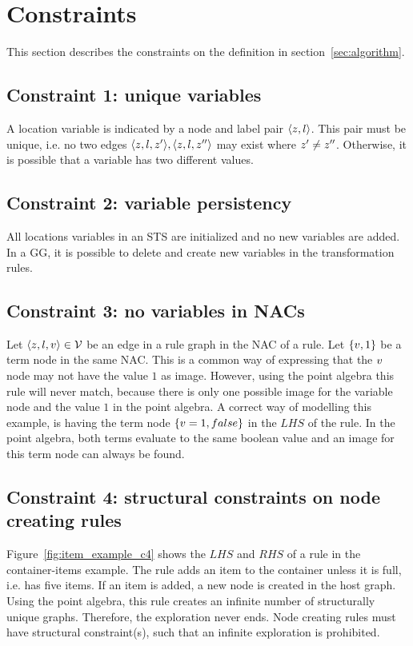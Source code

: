 \section{Constraints}\label{sec:constraints}

This section describes the constraints on the definition in section~\ref{sec:algorithm}.

\subsection{Constraint 1: unique variables}\label{sec:constraint-1}
A location variable is indicated by a node and label pair $\langle z, l\rangle$. This pair must be unique, i.e. no two edges $\langle z, l, z'\rangle, \langle z, l, z''\rangle$ may exist where $z' \neq z''$. Otherwise, it is possible that a variable has two different values.

\subsection{Constraint 2: variable persistency}
All locations variables in an STS are initialized and no new variables are added. In a GG, it is possible to delete and create new variables in the transformation rules. 

\subsection{Constraint 3: no variables in NACs}
Let $\langle z, l, v \rangle\in \mathcal{V}$ be an edge in a rule graph in the NAC of a rule. Let $\{v, 1\}$ be a term node in the same NAC. This is a common way of expressing that the $v$ node may not have the value $1$ as image. However, using the point algebra this rule will never match, because there is only one possible image for the variable node and the value $1$ in the point algebra. A correct way of modelling this example, is having the term node $\{v = 1, false\}$ in the $\mathit{LHS}$ of the rule. In the point algebra, both terms evaluate to the same boolean value and an image for this term node can always be found.

\subsection{Constraint 4: structural constraints on node creating rules}
Figure~\ref{fig:item_example_c4} shows the $\mathit{LHS}$ and $\mathit{RHS}$ of a rule in the container-items example. The rule adds an item to the container unless it is full, i.e. has five items. If an item is added, a new node is created in the host graph. Using the point algebra, this rule creates an infinite number of structurally unique graphs. Therefore, the exploration never ends. Node creating rules must have structural constraint(s), such that an infinite exploration is prohibited.


